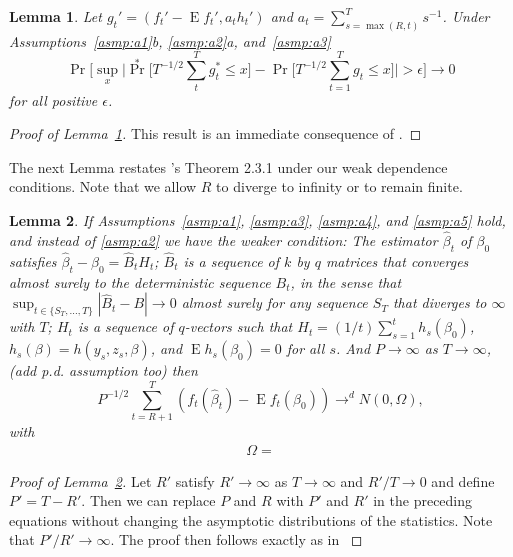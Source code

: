 \documentclass[12pt]{article}
\newcommand\citepos[2][]{\citeauthor{#2}'s \citeyearpar[#1]{#2}}
\newtheorem{lema}{Lemma}[section]
\theoremstyle{definition}
\DeclareMathOperator{\E}{E}
\DeclareMathOperator{\pr}{Pr}
\begin{document}
\begin{lema}\label{res:a3}
  Let $g_{t}' = (f_{t}' - \E f_{t}', a_t h_{t}')$ and $a_t =
  \sum_{s=\max(R,t)}^T s^{-1}$.  Under Assumptions~\ref{asmp:a1}b,
  \ref{asmp:a2}a, and~\ref{asmp:a3}
  \begin{equation}
    \pr\Big[\sup_x \Big| \pr^{*}\Big[ T^{-1/2} \sum_t^T g_{t}^{*}
    \leq x \Big] - \pr\Big[ T^{-1/2} \sum_{t=1}^T g_{t}
    \leq x \Big] \Big| > \epsilon \Big] \to 0
  \end{equation}
  for all positive $\epsilon$.
\end{lema}

\begin{proof}[Proof of Lemma~\ref{res:a3}]
  This result is an immediate consequence of \citet[Theorem 2]{GoJ:03}.
\end{proof}

The next Lemma restates \citepos{Mcc:00} Theorem 2.3.1 under our weak
dependence conditions.  Note that we allow $R$ to diverge to infinity
or to remain finite.

\begin{lema}\label{res:a5}
  If Assumptions~\ref{asmp:a1}, \ref{asmp:a3}, \ref{asmp:a4}, and
  \ref{asmp:a5} hold, and instead of \ref{asmp:a2} we have the weaker
  condition: The estimator $\hat{\beta}_t$ of $\beta_0$ satisfies
  $\hat{\beta}_{t} - \beta_{0} = \hat{B}_{t} H_t$; $\hat{B}_{t}$ is a
  sequence of $k$ by $q$ matrices that converges almost surely to the
  deterministic sequence $B_{t}$, in the sense that $\sup_{t \in
    \{S_T,\dots,T\}} | \hat{B}_{t} - B | \to 0$ almost surely for any
  sequence $S_T$ that diverges to $\infty$ with $T$; $H_{t}$ is a
  sequence of $q$-vectors such that $H_{t} = (1/t) \sum_{s=1}^t
  h_{s}(\beta_{0})$, $h_{s}(\beta) = h(y_{s}, z_{s}, \beta)$, and $\E
  h_{s}(\beta_{0}) = 0$ for all $s$.  And $P \to \infty$ as $T \to
  \infty$, (add p.d. assumption too) then
  \begin{equation}
    P^{-1/2} \sum_{t=R+1}^T
    (f_{t}(\hat{\beta}_{t}) - \E f_{t}(\beta_{0})) \to^d N(0, \Omega),
  \end{equation}
  with
  \begin{align}
    \Omega =     
  \end{align}
\end{lema}
\begin{proof}[Proof of Lemma~\ref{res:a5}]
  Let $R'$ satisfy $R' \to \infty$ as $T \to \infty$ and $R'/T \to 0$
  and define $P' = T - R'$.  Then we can replace $P$ and $R$ with $P'$
  and $R'$ in the preceding equations without changing the asymptotic
  distributions of the statistics.  Note that $P'/R' \to \infty$.  The
  proof then follows exactly as in \citet[Theorem 2.3.1]{Mcc:00}
\end{proof}
\end{document}
